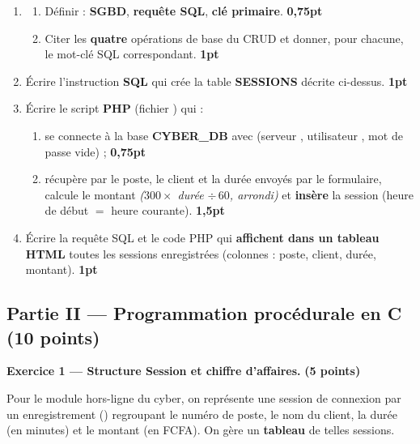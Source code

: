 \begin{enumerate}[label=\textbf{\arabic*-},leftmargin=2.2em]
\item \begin{enumerate}[label=\textbf{\alph*)},leftmargin=2em]
  \item Définir : \textbf{SGBD}, \textbf{requête SQL}, \textbf{clé primaire}. \hfill \textbf{0,75pt}
  \item Citer les \textbf{quatre} opérations de base du CRUD et donner, pour
  chacune, le mot-clé SQL correspondant. \hfill \textbf{1pt}
  \end{enumerate}
\item Écrire l'instruction \textbf{SQL} qui crée la table \textbf{SESSIONS}
décrite ci-dessus. \hfill \textbf{1pt}
\item Écrire le script \textbf{PHP} (fichier ) qui :
  \begin{enumerate}[label=\textbf{\alph*)},leftmargin=2em]
  \item se connecte à la base \textbf{CYBER\_DB} avec  (serveur
  , utilisateur , mot de passe vide) ; \hfill \textbf{0,75pt}
  \item récupère par  le poste, le client et la durée envoyés par
  le formulaire, calcule le montant \emph{($300 \times$ durée $\div\,60$, arrondi)}
  et \textbf{insère} la session (heure de début $=$ heure courante). \hfill \textbf{1,5pt}
  \end{enumerate}
\item Écrire la requête SQL et le code PHP qui \textbf{affichent dans un tableau
HTML} toutes les sessions enregistrées (colonnes : poste, client, durée, montant). \hfill \textbf{1pt}
\end{enumerate}

\subsection*{Partie II — Programmation procédurale en C \hfill (10 points)}

\textbf{Exercice 1 — Structure Session et chiffre d'affaires.} \hfill \textbf{(5 points)}

\smallskip
Pour le module hors-ligne du cyber, on représente une session de connexion par un
enregistrement () regroupant le numéro de poste, le nom du client, la
durée (en minutes) et le montant (en FCFA). On gère un \textbf{tableau} de telles
sessions.

